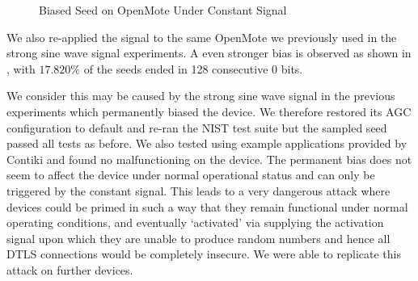 \begin{figure}[!t]
\centering
{}
\hfil
{}
\caption{Biased Seed on OpenMote Under Constant Signal}
\label{ConstantSignalBiased}
\end{figure}

We also re-applied the signal to the same OpenMote we previously used in the strong sine wave signal experiments. A even stronger bias is observed as shown in , with $17.820\%$ of the seeds ended in 128 consecutive $0$ bits.

We consider this may be caused by the strong sine wave signal in the previous experiments which permanently biased the device. We therefore restored its AGC configuration to default and re-ran the NIST test suite but the sampled seed passed all tests as before. We also tested using example applications provided by Contiki and found no malfunctioning on the device. The permanent bias does not seem to affect the device under normal operational status and can only be triggered by the constant signal. This leads to a very dangerous attack where devices could be primed in such a way that they remain functional under normal operating conditions, and eventually `activated' via supplying the activation signal upon which they are unable to produce random numbers and hence all DTLS connections would be completely insecure. We were able to replicate this attack on further devices.

